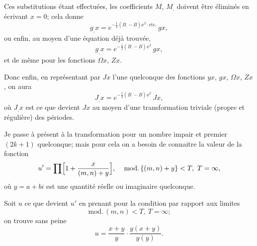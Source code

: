 \documentclass[11pt,a4paper]{article}
\providecommand{\md}{\,\mathrm{mod.}\,}
\begin{document}
Ces substitutions \'etant effectu\'ees, les coefficients $M$, $M_{,}$ doivent \^etre \'elimin\'es en \'ecrivant $x = 0$; cela donne
\[
g_{,} x = e^{-\frac{1}{2}(B_{,} - B) x^2 \cdot \text{etc.}}\, g x,
\]
ou enfin, au moyen d'une \'equation d\'ej\`a trouv\'ee,
\[
g_{,} x = e^{-\frac{1}{2}(B_{,} - B) x^2}\, g x,
\]
et de m\^eme pour les fonctions $\Omega x$, $Zx$.

\medskip

Donc enfin, en repr\'esentant par $Jx$ l'une quelconque des fonctions $yx$, $gx$, $\Omega x$, $Zx$, on aura
\[
J_{,} x = e^{-\frac{1}{2}(B_{,} - B) x^2}\, Jx,
\]
o\`u $J_{,} x$ est ce que devient $Jx$ au moyen d'une transformation triviale (propre et r\'eguli\`ere) des p\'eriodes.

\medskip

Je passe \`a pr\'esent \`a la transformation pour un nombre impair et premier $(2k+1)$ quelconque; mais pour cela on a besoin de connaitre la valeur de la fonction
\[
u' = \prod \Bigl[1 + \frac{x}{(m, n) + y}\Bigr],\quad \md\{(m, n) + y\} < T,\ T = \infty,
\]
o\`u $y = a + bi$ est une quantit\'e r\'eelle ou imaginaire quelconque.

\medskip

Soit $u$ ce que devient $u'$ en prenant pour la condition par rapport aux limites
\[ \md(m, n) < T,\ T = \infty; \]
on trouve sans peine
\[
u = \frac{x + y}{y}\cdot\frac{y(x+y)}{y(y)}.
\]

\medskip
\end{document}

